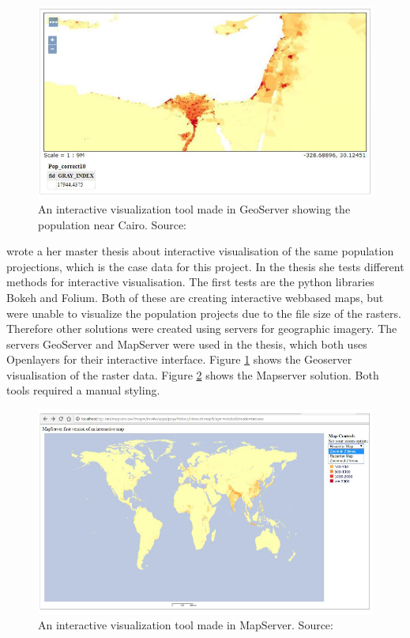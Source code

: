 \begin{figure} [H]
	\centering
	\includegraphics[width=.8\textwidth]{Pictures/Geoserver}
	\caption{An interactive visualization tool made in GeoServer showing the population near Cairo. Source: \citet{Sarah}}
	\label{Geoserver}
\end{figure}

\citet{Sarah} wrote a her master thesis about interactive visualisation of the same population projections, which is the case data for this project. In the thesis she tests different methods for interactive visualisation. The first tests are the python libraries Bokeh and Folium. Both of these are creating interactive webbased maps, but were unable to visualize the population projects due to the file size of the rasters. Therefore other solutions were created using servers for geographic imagery. The servers GeoServer and MapServer were used in the thesis, which both uses Openlayers for their interactive interface. Figure \ref{Geoserver} shows the Geoserver visualisation of the raster data. Figure \ref{Mapserver} shows the Mapserver solution. Both tools required a manual styling.

\begin{figure} [H]
	\centering
	\includegraphics[width=1\textwidth]{Pictures/Mapserver}
	\caption{An interactive visualization tool made in MapServer. Source: \citet{Sarah}}
	\label{Mapserver}
\end{figure}

